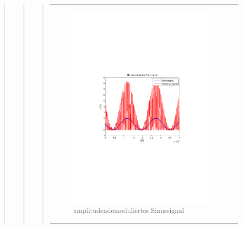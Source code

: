 \begin{quote}
\begin{quote}
\begin{quote}
                \begin{center}
                \begin{tabular}{ll}
    
                \hspace{-14em}
                    \begin{minipage}{0.6\textwidth}
    
                        \begin{figure}[H]
                            \label{fig:}
                            \includegraphics[scale=0.5, trim = 4cm 9.5cm 3.5cm
                        9.5cm, clip]{./Bilder/synchDemod_sinus} %
                            \caption{amplitudendemoduliertes Sinussignal}
                        \end{figure}
    

\end{minipage}
\end{tabular}
\end{center}
\end{quote}
\end{quote}
\end{quote}
